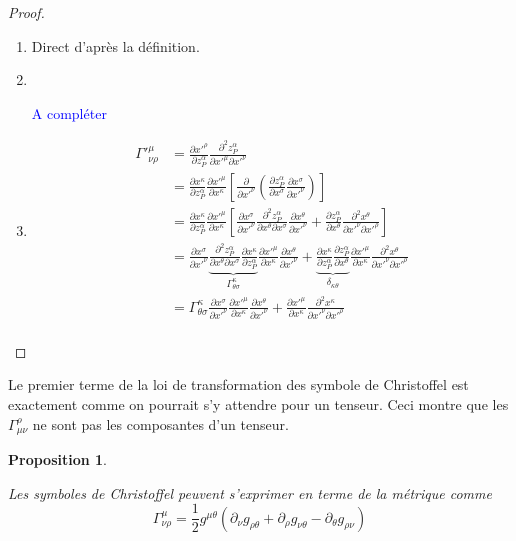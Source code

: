 \documentclass[a4paper,11pt]{report}
\theoremstyle{definition}
\theoremstyle{plain}
\newtheorem{prop}[thm]{Proposition}
\theoremstyle{definition}
\theoremstyle{remark}
\newcommand{\comp}{\begin{center}\textcolor{blue}{A compléter}\end{center}}
\newcommand{\p}{\partial}
\begin{document}
            \begin{proof}${}$\\
            \begin{enumerate}[label = \textit{\roman*)}]
                \item Direct d'après la définition.
                \item ${}$\\
                \comp
                \item \begin{align}
                    \Gamma'^\mu_{\nu\rho} &= \frac{\p x'^\rho}{\p z^\alpha_P}\frac{\p^2 z^\alpha_P}{\p x'^\mu\p x'^\nu} \\
                    &= \frac{\p x^\kappa}{\p z^\alpha_P}\frac{\p x'^\mu}{\p x^\kappa}\left[ \frac{\p}{\p x'^\nu}\left( \frac{\p z^\alpha_P}{\p x^\sigma}\frac{\p x^\sigma}{\p x'^\nu} \right) \right] \\
                    &= \frac{\p x^\kappa}{\p z^\alpha_P}\frac{\p x'^\mu}{\p x^\kappa}\left[\frac{\p x^\sigma}{\p x'^\nu} \frac{\p^2 z^\alpha_P}{\p x^\theta\p x^\sigma}\frac{\p x^\theta}{\p x'^\nu} + \frac{\p z^\alpha_P}{\p x^\theta}\frac{\p^2 x^\theta}{\p x'^\nu\p x'^\rho} \right]\\
                    &= \frac{\p x^\sigma}{\p x'^\nu} \underbrace{\frac{\p^2 z^\alpha_P}{\p x^\theta\p x^\sigma}\frac{\p x^\kappa}{\p z^\alpha_P}}_{\Gamma^\kappa_{\theta\sigma}}\frac{\p x'^\mu}{\p x^\kappa}\frac{\p x^\theta}{\p x'^\nu} +  \underbrace{\frac{\p x^\kappa}{\p z^\alpha_P}\frac{\p z^\alpha_P}{\p x^\theta}}_{\delta_{\kappa\theta}}\frac{\p x'^\mu}{\p x^\kappa}\frac{\p^2 x^\theta}{\p x'^\nu\p x'^\rho}\\
                    &= \Gamma^\kappa_{\theta\sigma}\frac{\p x^\sigma}{\p x'^\nu} \frac{\p x'^\mu}{\p x^\kappa}\frac{\p x^\theta}{\p x'^\nu} +  \frac{\p x'^\mu}{\p x^\kappa}\frac{\p^2 x^\kappa}{\p x'^\nu\p x'^\rho}\\
                \end{align}
            \end{enumerate}
            \end{proof}
            
            Le premier terme de la loi de transformation des symbole de Christoffel est exactement comme on pourrait s'y attendre pour un tenseur. Ceci montre que les $\Gamma^\rho_{\mu\nu}$ ne sont pas les composantes d'un tenseur.
            
            \begin{prop}\begin{leftbar}
                Les symboles de Christoffel peuvent s'exprimer en terme de la métrique comme
                \begin{equation}\label{eq:gammag}
                    \Gamma^\mu_{\nu\rho} = \frac{1}{2}g^{\mu\theta}\left( \p_\nu g_{\rho\theta}+\p_\rho g_{\nu\theta}-\p_\theta g_{\rho\nu} \right)
                \end{equation}
            \end{leftbar}\end{prop}
            
\end{document}
